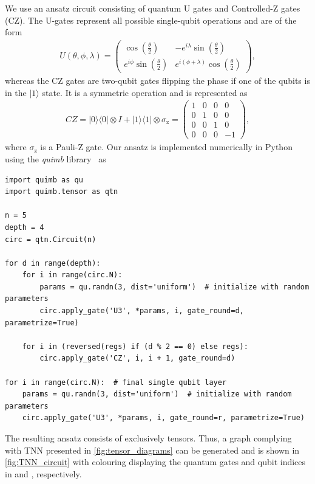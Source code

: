 We use an ansatz circuit consisting of quantum U gates and Controlled-Z gates (CZ). The U-gates represent all possible single-qubit operations and are of the form
\begin{align}
    U(\theta, \phi, \lambda) =
            \begin{pmatrix}
                \cos\left(\frac{\theta}{2}\right)          & -e^{i\lambda}\sin\left(\frac{\theta}{2}\right) \\
                e^{i\phi}\sin\left(\frac{\theta}{2}\right) & e^{i(\phi+\lambda)}\cos\left(\frac{\theta}{2}\right)
            \end{pmatrix}
            ,
\end{align}
whereas the CZ gates are two-qubit gates flipping the phase if one of the qubits is in the $|1\rangle$ state. It is a symmetric operation and is represented as
\begin{align}
    CZ=
        |0\rangle\langle 0| \otimes I + |1\rangle\langle 1| \otimes \sigma_\text{z} =
        \begin{pmatrix}
            1 & 0 & 0 & 0 \\
            0 & 1 & 0 & 0 \\
            0 & 0 & 1 & 0 \\
            0 & 0 & 0 & -1
        \end{pmatrix}
        ,
\end{align}
where $\sigma_\text{z}$ is a Pauli-Z gate.
Our ansatz is implemented numerically in Python using the \emph{quimb} library~\cite{Gray2018} as
\begin{verbatim}
import quimb as qu
import quimb.tensor as qtn

n = 5
depth = 4
circ = qtn.Circuit(n)

for d in range(depth):
    for i in range(circ.N):
        params = qu.randn(3, dist='uniform')  # initialize with random parameters
        circ.apply_gate('U3', *params, i, gate_round=d, parametrize=True)

    for i in (reversed(regs) if (d % 2 == 0) else regs):
        circ.apply_gate('CZ', i, i + 1, gate_round=d)

for i in range(circ.N):  # final single qubit layer
    params = qu.randn(3, dist='uniform')  # initialize with random parameters
    circ.apply_gate('U3', *params, i, gate_round=r, parametrize=True)
\end{verbatim}
The resulting ansatz consists of exclusively tensors. Thus, a graph complying with TNN presented in \cref{fig:tensor_diagrams} can be generated and is shown in \cref{fig:TNN_circuit} with colouring displaying the quantum gates and qubit indices in \protect{} and \protect{}, respectively.
